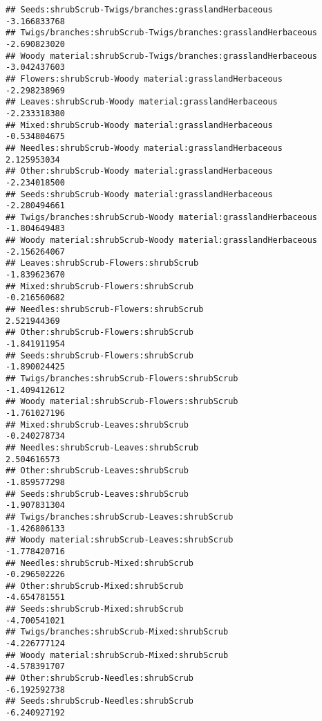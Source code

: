 \documentclass[
]{article}
\begin{document}
\begin{verbatim}
## Seeds:shrubScrub-Twigs/branches:grasslandHerbaceous                   -3.166833768
## Twigs/branches:shrubScrub-Twigs/branches:grasslandHerbaceous          -2.690823020
## Woody material:shrubScrub-Twigs/branches:grasslandHerbaceous          -3.042437603
## Flowers:shrubScrub-Woody material:grasslandHerbaceous                 -2.298238969
## Leaves:shrubScrub-Woody material:grasslandHerbaceous                  -2.233318380
## Mixed:shrubScrub-Woody material:grasslandHerbaceous                   -0.534804675
## Needles:shrubScrub-Woody material:grasslandHerbaceous                  2.125953034
## Other:shrubScrub-Woody material:grasslandHerbaceous                   -2.234018500
## Seeds:shrubScrub-Woody material:grasslandHerbaceous                   -2.280494661
## Twigs/branches:shrubScrub-Woody material:grasslandHerbaceous          -1.804649483
## Woody material:shrubScrub-Woody material:grasslandHerbaceous          -2.156264067
## Leaves:shrubScrub-Flowers:shrubScrub                                  -1.839623670
## Mixed:shrubScrub-Flowers:shrubScrub                                   -0.216560682
## Needles:shrubScrub-Flowers:shrubScrub                                  2.521944369
## Other:shrubScrub-Flowers:shrubScrub                                   -1.841911954
## Seeds:shrubScrub-Flowers:shrubScrub                                   -1.890024425
## Twigs/branches:shrubScrub-Flowers:shrubScrub                          -1.409412612
## Woody material:shrubScrub-Flowers:shrubScrub                          -1.761027196
## Mixed:shrubScrub-Leaves:shrubScrub                                    -0.240278734
## Needles:shrubScrub-Leaves:shrubScrub                                   2.504616573
## Other:shrubScrub-Leaves:shrubScrub                                    -1.859577298
## Seeds:shrubScrub-Leaves:shrubScrub                                    -1.907831304
## Twigs/branches:shrubScrub-Leaves:shrubScrub                           -1.426806133
## Woody material:shrubScrub-Leaves:shrubScrub                           -1.778420716
## Needles:shrubScrub-Mixed:shrubScrub                                   -0.296502226
## Other:shrubScrub-Mixed:shrubScrub                                     -4.654781551
## Seeds:shrubScrub-Mixed:shrubScrub                                     -4.700541021
## Twigs/branches:shrubScrub-Mixed:shrubScrub                            -4.226777124
## Woody material:shrubScrub-Mixed:shrubScrub                            -4.578391707
## Other:shrubScrub-Needles:shrubScrub                                   -6.192592738
## Seeds:shrubScrub-Needles:shrubScrub                                   -6.240927192

\end{verbatim}
\end{document}
